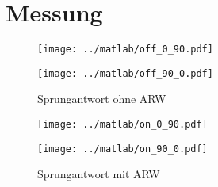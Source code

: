 \section{Messung}
\begin{figure}[h!]
    \begin{minipage}{0.45\textwidth}
        \centering
        \texttt{[image: ../matlab/off\_0\_90.pdf]}
        \label{fig:off_0_90}
    \end{minipage}
    \begin{minipage}{0.45\textwidth}
        \centering
        \texttt{[image: ../matlab/off\_90\_0.pdf]}
        \label{fig:off_0_90}
    \end{minipage}
    \caption{Sprungantwort ohne ARW}
    \label{fig:off}
\end{figure}
\begin{figure}[h!]
    \begin{minipage}{0.45\textwidth}
        \centering
        \texttt{[image: ../matlab/on\_0\_90.pdf]}
        \label{fig:on_0_90}
    \end{minipage}
    \begin{minipage}{0.45\textwidth}
        \centering
        \texttt{[image: ../matlab/on\_90\_0.pdf]}
        \label{fig:on_0_90}
    \end{minipage}
    \caption{Sprungantwort mit ARW}
    \label{fig:on}
\end{figure}
